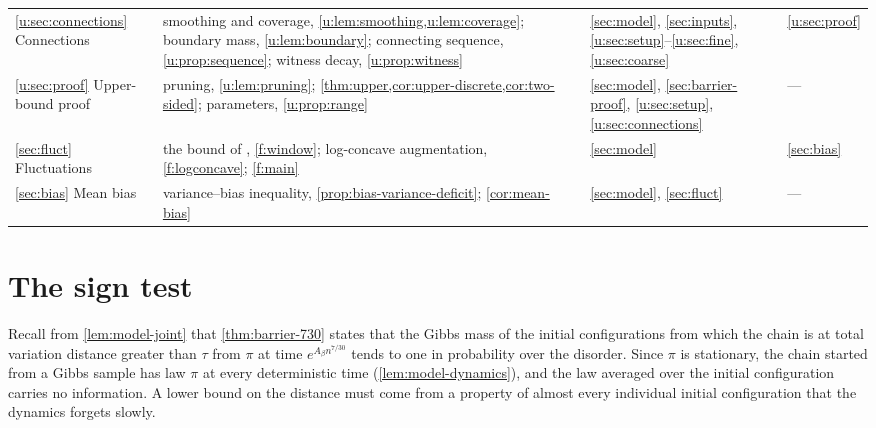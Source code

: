 \begin{table}[!t]
\begin{tabular}{@{}>{\raggedright\arraybackslash}p{}>{\raggedright\arraybackslash}p{}>{\raggedright\arraybackslash}p{}>{\raggedright\arraybackslash}p{}@{}}
\ref{u:sec:connections} Connections & smoothing and coverage,
 \cref{u:lem:smoothing,u:lem:coverage}; boundary mass, \cref{u:lem:boundary};
 connecting sequence, \cref{u:prop:sequence}; witness decay,
 \cref{u:prop:witness} & \ref{sec:model}, \ref{sec:inputs},
 \ref{u:sec:setup}--\ref{u:sec:fine}, \ref{u:sec:coarse}
 & \ref{u:sec:proof}\\
\ref{u:sec:proof} Upper-bound proof & pruning, \cref{u:lem:pruning};
 \cref{thm:upper,cor:upper-discrete,cor:two-sided}; parameters,
 \cref{u:prop:range} & \ref{sec:model}, \ref{sec:barrier-proof},
 \ref{u:sec:setup}, \ref{u:sec:connections} & ---\\
\ref{sec:fluct} Fluctuations & the bound of \cite{oai-fluctuations},
 \cref{f:window}; log-concave augmentation, \cref{f:logconcave}; \cref{f:main}
 & \ref{sec:model} & \ref{sec:bias}\\
\ref{sec:bias} Mean bias & variance--bias inequality,
 \cref{prop:bias-variance-deficit}; \cref{cor:mean-bias} & \ref{sec:model}, \ref{sec:fluct} & ---\\
\bottomrule
\end{tabular}
\end{table}

\section{The sign test}\label{sec:ov-sign}

Recall from \cref{lem:model-joint} that \cref{thm:barrier-730} states that
the Gibbs mass of the initial configurations from which the chain is at total
variation distance greater than $\tau$ from $\pi$ at time
$e^{A_\beta n^{7/30}}$ tends to one in probability over the disorder. Since $\pi$ is stationary, the chain started from a Gibbs sample has
law $\pi$ at every deterministic time (\cref{lem:model-dynamics}), and the law
averaged over the initial configuration carries no information. A lower bound
on the distance must come from a property of almost every individual initial
configuration that the dynamics forgets slowly.

